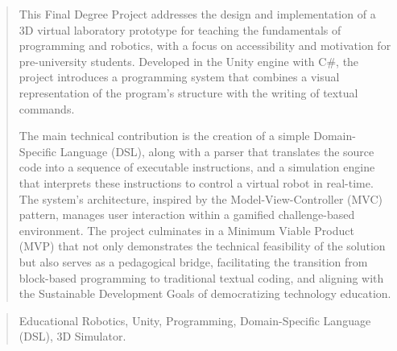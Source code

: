 \documentclass[a4paper,12pt,twoside]{memoir}
\begin{document}
		\renewcommand*\abstractname{Abstract}
		\begin{abstract}
This Final Degree Project addresses the design and implementation of a 3D virtual laboratory prototype for teaching the fundamentals of programming and robotics, with a focus on accessibility and motivation for pre-university students. Developed in the Unity engine with C\#, the project introduces a programming system that combines a visual representation of the program's structure with the writing of textual commands.

The main technical contribution is the creation of a simple Domain-Specific Language (DSL), along with a parser that translates the source code into a sequence of executable instructions, and a simulation engine that interprets these instructions to control a virtual robot in real-time. The system's architecture, inspired by the Model-View-Controller (MVC) pattern, manages user interaction within a gamified challenge-based environment. The project culminates in a Minimum Viable Product (MVP) that not only demonstrates the technical feasibility of the solution but also serves as a pedagogical bridge, facilitating the transition from block-based programming to traditional textual coding, and aligning with the Sustainable Development Goals of democratizing technology education.
		\end{abstract}
		
		\renewcommand*\abstractname{Keywords}
		\begin{abstract}
		    Educational Robotics, Unity, Programming, Domain-Specific Language (DSL), 3D Simulator.
		
		\end{abstract}
		
		\clearpage
		
		
		\tableofcontents
		
		\clearpage
		
		\listoffigures
		
		\clearpage
		
		\listoftables
		\clearpage
		
		\mainmatter
		
		
		
		
		
		
		
		
		\printnoidxglossary[type=\acronymtype]
		
		
		
		
	
\end{document}
